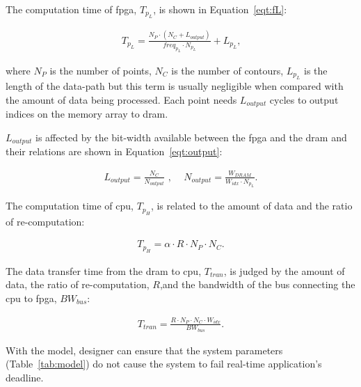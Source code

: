 The computation time of \gls{fpga}, $T_{p_L}$, is shown in Equation~\ref{eqt:fL}:

\begin{equation}
\begin{aligned}
T_{p_L} = \frac{N_P \cdot (N_C+L_{output})}{freq_{p_L} \cdot N_{p_L}} + L_{p_L} \mbox{,}
\end{aligned}
\label{eqt:fL}
\end{equation}

where $N_P$ is the number of points, $N_C$ is the number of contours,
$L_{p_L}$ is the length of the data-path but this term is usually negligible when compared with the amount of data being processed.
Each point needs $L_{output}$ cycles to output indices on the memory array to \gls{dram}.

$L_{output}$ is affected by the bit-width available between the \gls{fpga} and the \gls{dram} and their relations are shown in Equation~\ref{eqt:output}:

\begin{equation}
\begin{aligned}
L_{output} = \frac{N_C}{N_{output}} \mbox{ , } \quad
N_{output} = \frac{W_{DRAM}}{W_{idx} \cdot N_{p_L}} \mbox{.}
\end{aligned}
\label{eqt:output}
\end{equation}

The computation time of \gls{cpu}, $T_{p_H}$, is related to the amount of data and the ratio of re-computation:

\begin{equation}
\begin{aligned}
T_{p_H} = \alpha \cdot R \cdot N_P \cdot N_C \mbox{.}
\end{aligned}
\label{eqt:fH}
\end{equation}

The data transfer time from the \gls{dram} to \gls{cpu}, $T_{tran}$, is judged by the amount of data, the ratio of re-computation, $R$,and the bandwidth of the bus connecting the \gls{cpu} to \gls{fpga}, $BW_{bus}$:

\begin{equation}
\begin{aligned}
T_{tran} = \frac{R \cdot N_P \cdot N_C \cdot W_{idx}}{BW_{bus}} \mbox{.}
\end{aligned}
\label{eqt:tran}
\end{equation}

With the model, designer can ensure that the system parameters (Table~\ref{tab:model}) do not cause the system to fail real-time application's deadline.

